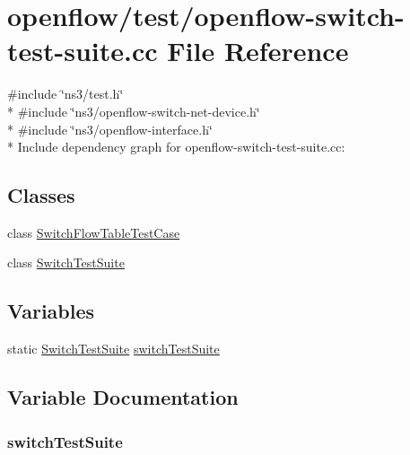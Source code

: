 \hypertarget{openflow-switch-test-suite_8cc}{}\section{openflow/test/openflow-\/switch-\/test-\/suite.cc File Reference}
\label{openflow-switch-test-suite_8cc}
{\ttfamily \#include \char`\"{}ns3/test.\+h\char`\"{}}\\*
{\ttfamily \#include \char`\"{}ns3/openflow-\/switch-\/net-\/device.\+h\char`\"{}}\\*
{\ttfamily \#include \char`\"{}ns3/openflow-\/interface.\+h\char`\"{}}\\*
Include dependency graph for openflow-\/switch-\/test-\/suite.cc\+:
\subsection*{Classes}
\begin{DoxyCompactItemize}
\item 
class \hyperlink{classSwitchFlowTableTestCase}{Switch\+Flow\+Table\+Test\+Case}
\item 
class \hyperlink{classSwitchTestSuite}{Switch\+Test\+Suite}
\end{DoxyCompactItemize}
\subsection*{Variables}
\begin{DoxyCompactItemize}
\item 
static \hyperlink{classSwitchTestSuite}{Switch\+Test\+Suite} \hyperlink{openflow-switch-test-suite_8cc_a0385b4126b22ca8bd80676fbdded3d19}{switch\+Test\+Suite}
\end{DoxyCompactItemize}


\subsection{Variable Documentation}
\subsubsection[{\texorpdfstring{switch\+Test\+Suite}{switchTestSuite}}]{ switch\+Test\+Suite\hspace{0.3cm}{\ttfamily [static]}}\hypertarget{openflow-switch-test-suite_8cc_a0385b4126b22ca8bd80676fbdded3d19}{}\label{openflow-switch-test-suite_8cc_a0385b4126b22ca8bd80676fbdded3d19}
